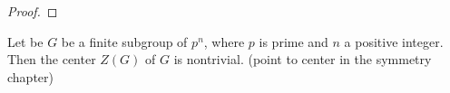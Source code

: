 \begin{proof}
{%


}%
\end{proof}
\begin{lemma}
  \label{lem:nontrivcenter}
  Let be $G$ be a finite subgroup of \gporder $p^n$, where $p$ is prime and $n$ a positive integer.  
Then the center $Z(G)$ of $G$ is nontrivial. 
(point to center in the symmetry chapter)
\end{lemma}
